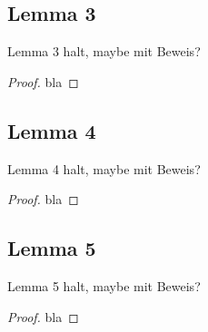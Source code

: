 
\subsection{Lemma 3}
    \label{subsec:lemma3}
    Lemma 3 halt, maybe mit Beweis?
    \begin{proof}
        bla
    \end{proof}

\subsection{Lemma 4}
    \label{subsec:lemma4}
    Lemma 4 halt, maybe mit Beweis?
    \begin{proof}
        bla
    \end{proof}

\subsection{Lemma 5}
    \label{subsec:lemma5}
    Lemma 5 halt, maybe mit Beweis?
    \begin{proof}
        bla
    \end{proof}
    
